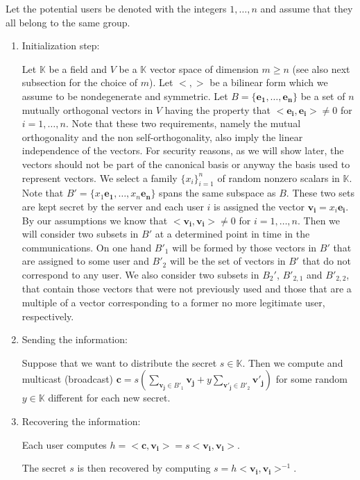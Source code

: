 \documentclass[a4paper,11pt]{amsart}
\theoremstyle{definition}
\newcommand{\K}{\mathbb{K}}
\begin{document}
Let the potential users be denoted with the integers $1,\ldots,n$ and
assume that they all belong to the same group.
\begin{enumerate}

\item Initialization step:

  Let $\K$ be a field and $V$ be a $\K$ vector space of dimension
  $m\geq n$ (see also next subsection for the choice of $m$).  Let
  $<,>$ be a bilinear form which we assume to be nondegenerate and
  symmetric.  Let $B=\{ \mathbf{e_1}, \dots ,\mathbf{e_n} \}$ be a set
  of $n$ mutually orthogonal vectors in $V$ having the property that
  $<\mathbf{e_i},\mathbf{e_i} >\neq 0$ for $i=1,\ldots,n$. Note that these two requirements, namely the mutual orthogonality and the non self-orthogonality, also imply the linear independence of the vectors. For security reasons, as we will show later, the vectors should not be part of the
  canonical basis or anyway the basis used to represent vectors.  We
  select a family $\{ x_i \}_{i=1}^n$ of random nonzero scalars in
  $\K$.  Note that $B'=\{ x_1 \mathbf{e_1}, \dots , x_n \mathbf{e_n}
  \}$ spans the same subspace as $B$. These two sets are kept secret
  by the server and each user $i$ is assigned the vector
  $\mathbf{v_i}=x_i\mathbf{e_i} $. By our assumptions we know that
  $<\mathbf{v_i} ,\mathbf{v_i} >\neq 0$ for $i=1,\ldots,n$. Then we
  will consider two subsets in $B'$ at a determined point in time in
  the communications. On one hand $B'_1$ will be formed by those
  vectors in $B'$ that are assigned to some user and $B'_2$ will be
  the set of vectors in $B'$ that do not correspond to any user. We
  also consider two subsets in $B_2'$, $B'_{2,1}$ and $B'_{2,2}$, that
  contain those vectors that were not previously used and those that
  are a multiple of a vector corresponding to a former no more
  legitimate user, respectively.


\item Sending the information:

  Suppose that we want to distribute the secret $s\in \K$. Then we
  compute and multicast (broadcast) $\mathbf{c} =s(\sum_{\mathbf{v_j}\in
    B'_1}\mathbf{v_j}+y\sum_{\mathbf{v'_j}\in B'_2}\mathbf{v'_j}
  )$ for some random $y\in \K$ different for each new secret.
\item Recovering the information:

  Each user computes $h=<\mathbf{c} ,\mathbf{v_i} >=s<\mathbf{v_i}
  ,\mathbf{v_i} >$.

  The secret $s$ is then recovered by computing $s=h<\mathbf{v_i}
  ,\mathbf{v_i} >^{-1}$.


\end{enumerate}
\end{document}
